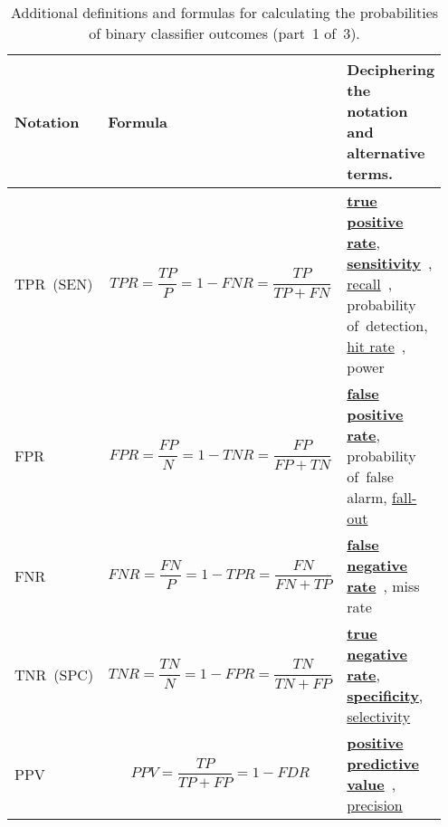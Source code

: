 \documentclass[]{scrreprt}
\begin{document}
\begin{table}[htp]
	\caption{Additional definitions and formulas for calculating the probabilities of binary classifier outcomes (part~1 of~3).}\label{tab:ROC-rates-1}
	\tiny
	\begin{tabularx}{\textwidth}{p{0.15\linewidth} p{0.4\linewidth} p{0.4\linewidth}} 
		\hline
		Notation&Formula&Deciphering the notation and alternative terms.\\
		\hline
		TPR~(SEN)&\begin{equation}\label{TPR}
		TPR=\frac{TP}{P}=1-FNR=\frac{TP}{TP+FN}
		\end{equation}&\href{https://en.wikipedia.org/wiki/Sensitivity_(test)}{\textbf{true positive rate}}, \href{https://en.wikipedia.org/wiki/Sensitivity_(test)}{\textbf{sensitivity}}~\cite{Wiki:sensitivity-and-specificity}, \href{https://en.wikipedia.org/wiki/Precision_and_recall}{recall}~\cite{Wiki:precision-and-recall}, probability of~detection, \href{https://en.wikipedia.org/wiki/Hit_rate}{hit rate}~\cite{Wiki:hit-rate}, power\\
		\hline
		FPR&\begin{equation}\label{eq:FPR}
		FPR = \frac{FP}{N} = 1 - TNR = \frac{FP}{FP+TN}
		\end{equation}&\href{https://en.wikipedia.org/wiki/False_positive_rate}{\textbf{false positive rate}}, probability of~false alarm, \href{https://en.wikipedia.org/wiki/False_positive_rate}{fall-out}~\cite{Wiki:FPR}\\
		\hline
		FNR&\begin{equation}\label{eq:FNR}
		FNR = \frac{FN}{P} = 1 - TPR = \frac{FN}{FN+TP}
		\end{equation}&\href{https://en.wikipedia.org/wiki/Type_I_and_type_II_errors\#False_positive_and_false_negative_rates}{\textbf{false negative rate}}~\cite{Wiki:TypeI-TypeII-errors}, miss rate\\
		\hline
		TNR~(SPC)&\begin{equation}\label{eq:TNR}
		TNR = \frac{TN}{N} = 1 - FPR = \frac{TN}{TN+FP}
		\end{equation}&\href{https://en.wikipedia.org/wiki/Sensitivity_(test)}{\textbf{true negative rate}}, \href{https://en.wikipedia.org/wiki/Sensitivity_(test)}{\textbf{specificity}}, \href{https://en.wikipedia.org/wiki/Sensitivity_(test)}{selectivity}~\cite{Wiki:sensitivity-and-specificity}\\
		\hline
		PPV&\begin{equation}\label{eq:PPV}
		PPV = \frac{TP}{TP+FP} = 1 - FDR
		\end{equation}&\href{https://en.wikipedia.org/wiki/Positive_and_negative_predictive_values}{\textbf{positive predictive value}}~\cite{Wiki:PPV}, \href{https://en.wikipedia.org/wiki/Information_retrieval\#Precision}{precision}~\cite{Wiki:precision}\\

\end{tabularx}
\end{table}
\end{document}

